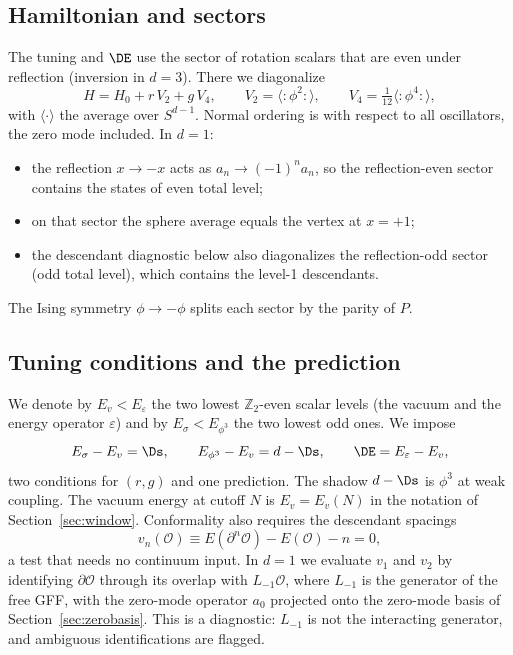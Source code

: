 \subsection{Hamiltonian and sectors}
The tuning and $\DE$ use the sector of rotation scalars that are even under reflection (inversion in $d=3$). There
we diagonalize
\begin{equation}
 H=H_0+r\,V_2+g\,V_4,\qquad V_2=\big\langle{:}\phi^2{:}\big\rangle,\qquad V_4=\tfrac1{12}\big\langle{:}\phi^4{:}\big\rangle,
 \label{eq:H}
\end{equation}
with $\langle\cdot\rangle$ the average over $S^{d-1}$. Normal ordering is with respect to all oscillators, the zero
mode included. In $d=1$:
\begin{itemize}
\item the reflection $x\to-x$ acts as $a_n\to(-1)^na_n$, so the reflection-even sector contains the states of even
 total level;
\item on that sector the sphere average equals the vertex at $x=+1$;
\item the descendant diagnostic below also diagonalizes the reflection-odd sector (odd total level), which contains
 the level-1 descendants.
\end{itemize}
The Ising symmetry $\phi\to-\phi$ splits each sector by the parity of $P$.

\subsection{Tuning conditions and the prediction}
We denote by $E_v<E_\varepsilon$ the two lowest $\mathbb Z_2$-even scalar levels (the vacuum and the energy operator
$\varepsilon$) and by $E_\sigma<E_{\phi^3}$ the two lowest odd ones. We impose
\begin{equation}
 E_\sigma-E_v=\Ds,\qquad E_{\phi^3}-E_v=d-\Ds,\qquad\DE=E_\varepsilon-E_v ,
 \label{eq:tune}
\end{equation}
two conditions for $(r,g)$ and one prediction. The shadow $d-\Ds$ is $\phi^3$ at weak coupling. The vacuum energy
at cutoff $N$ is $E_v=E_v(N)$ in the notation of Section~\ref{sec:window}. Conformality also
requires the descendant spacings
\begin{equation}
 v_n(\mathcal O)\equiv E(\partial^n\mathcal O)-E(\mathcal O)-n=0 ,
 \label{eq:v}
\end{equation}
a test that needs no continuum input. In $d=1$ we evaluate $v_1$ and $v_2$ by identifying $\partial\mathcal O$
through its overlap with $L_{-1}\mathcal O$, where $L_{-1}$ is the generator of the free GFF, with the zero-mode
operator $a_0$ projected onto the zero-mode basis of Section~\ref{sec:zerobasis}.
This is a diagnostic: $L_{-1}$ is not the interacting generator, and ambiguous identifications are flagged.

